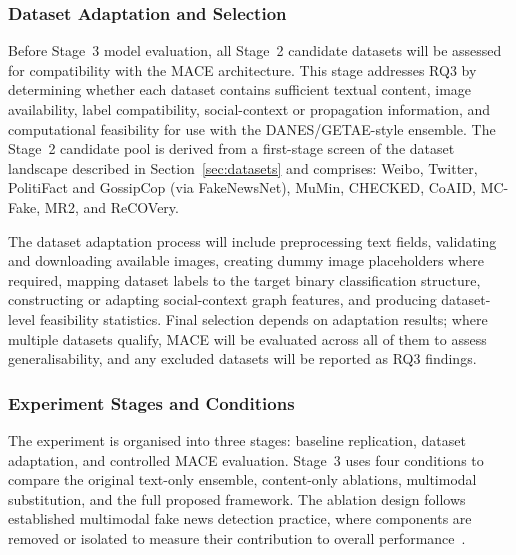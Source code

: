 \subsubsection{Dataset Adaptation and Selection}

Before Stage~3 model evaluation, all Stage~2 candidate datasets will be assessed for compatibility with the MACE architecture. This stage addresses RQ3 by determining whether each dataset contains sufficient textual content, image availability, label compatibility, social-context or propagation information, and computational feasibility for use with the DANES/GETAE-style ensemble. The Stage~2 candidate pool is derived from a first-stage screen of the dataset landscape described in Section~\ref{sec:datasets} and comprises: Weibo, Twitter, PolitiFact and GossipCop (via FakeNewsNet), MuMin, CHECKED, CoAID, MC-Fake, MR2, and ReCOVery.

The dataset adaptation process will include preprocessing text fields, validating and downloading available images, creating dummy image placeholders where required, mapping dataset labels to the target binary classification structure, constructing or adapting social-context graph features, and producing dataset-level feasibility statistics. Final selection depends on adaptation results; where multiple datasets qualify, MACE will be evaluated across all of them to assess generalisability, and any excluded datasets will be reported as RQ3 findings.

\subsubsection{Experiment Stages and Conditions}
The experiment is organised into three stages: baseline replication, dataset adaptation, and controlled MACE evaluation. Stage~3 uses four conditions to compare the original text-only ensemble, content-only ablations, multimodal substitution, and the full proposed framework. The ablation design follows established multimodal fake news detection practice, where components are removed or isolated to measure their contribution to overall performance~\citep{Qian2021}.

